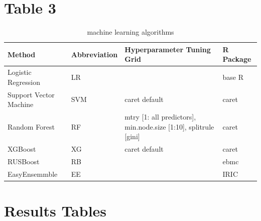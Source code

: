\documentclass[
]{article}
\begin{document}
\newpage

\hypertarget{table-3}{%
\section{Table 3}\label{table-3}}

\begin{table}[!h]

\caption{\label{tab:tab:table} machine learning algorithms  }
\centering
\begin{tabular}[t]{llll}
\toprule
Method & Abbreviation & Hyperparameter Tuning Grid & R Package\\
\midrule
Logistic Regression & LR &  & base R \cite{r}\\
\addlinespace
Support Vector Machine & SVM & caret default & caret \cite{caret}\\
\addlinespace
Random Forest & RF & mtry [1: all predictors], min.node.size [1:10], splitrule [gini] & caret \cite{caret}\\
\addlinespace
XGBoost & XG & caret default & caret \cite{caret}\\
\addlinespace
RUSBoost & RB &  & ebmc \cite{ebmc}\\
\addlinespace
EasyEnsemmble & EE &  & IRIC \cite{iric}\\
\bottomrule
\end{tabular}
\end{table}

\newpage

\hypertarget{results-tables}{%
\section{Results Tables}\label{results-tables}}
\end{document}
